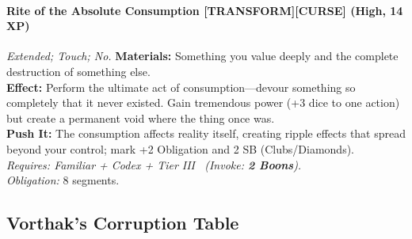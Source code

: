 \paragraph{Rite of the Absolute Consumption \textnormal{[TRANSFORM][CURSE]} (High, 14 XP)} \emph{Extended; Touch; No.}
\textbf{Materials:} Something you value deeply and the complete destruction of something else.\\
\textbf{Effect:} Perform the ultimate act of consumption—devour something so completely that it never existed. Gain tremendous power (+3 dice to one action) but create a permanent void where the thing once was.\\
\textbf{Push It:} The consumption affects reality itself, creating ripple effects that spread beyond your control; mark +2 Obligation and 2 SB (Clubs/Diamonds).\\
\emph{Requires: Familiar + Codex + Tier III \ (\textit{Invoke:} \textbf{2 Boons}).}\\
\emph{Obligation:} 8 segments.

\subsection*{Vorthak's Corruption Table}
\label{sec:vorthak-corruption}

